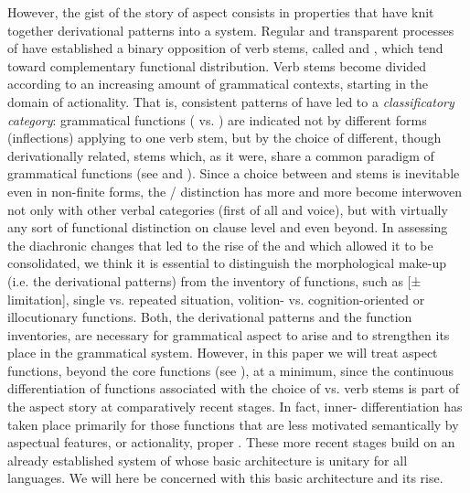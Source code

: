 \documentclass[output=paper]{langsci/langscibook}
\begin{document}
However, the gist of the story of  aspect consists in properties that have knit together derivational patterns into a system. Regular and transparent processes of  have established a binary opposition of verb stems, called  and , which tend toward complementary functional distribution. Verb stems become divided according to an increasing amount of grammatical contexts, starting in the domain of actionality. That is, consistent patterns of  have led to a \textit{classificatory category}: grammatical functions ( vs. ) are indicated not by different forms (inflections) applying to one verb stem, but by the choice of different, though derivationally related, stems which, as it were, share a common paradigm of grammatical functions (see  and ). Since a choice between  and  stems is inevitable even in non-finite forms, the / distinction has more and more become interwoven not only with other verbal categories (first of all  and voice), but with virtually any sort of functional distinction on clause level and even beyond.
In assessing the diachronic changes that led to the rise of the   and which allowed it to be consolidated, we think it is essential to distinguish the morphological make-up (i.e. the derivational patterns) from the inventory of functions, such as [± limitation], single vs. repeated situation, volition- vs. cognition-oriented  or illocutionary functions. Both, the derivational patterns and the function inventories, are necessary for grammatical aspect to arise and to strengthen its place in the grammatical system. However, in this paper we will treat aspect functions, beyond the core functions (see ), at a minimum, since the continuous differentiation of functions associated with the choice of  vs.  verb stems is part of the aspect story at comparatively recent stages. In fact, inner- differentiation has taken place primarily for those functions that are less motivated semantically by aspectual features, or actionality, proper \citep{Wiemer2008,Wiemer2015}. These more recent stages build on an already established system of  whose basic architecture is unitary for all  languages. We will here be concerned with this basic architecture and its rise.
\end{document}
